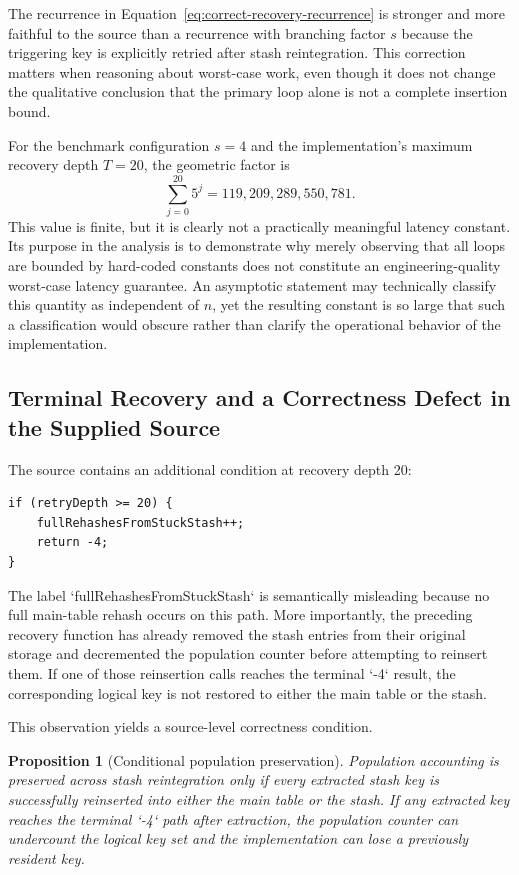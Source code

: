\documentclass[conference]{IEEEtran}
\newtheorem{proposition}{Proposition}
\begin{document}
The recurrence in Equation~\eqref{eq:correct-recovery-recurrence} is stronger and more faithful to the source than a recurrence with branching factor $s$ because the triggering key is explicitly retried after stash reintegration. This correction matters when reasoning about worst-case work, even though it does not change the qualitative conclusion that the primary loop alone is not a complete insertion bound.

For the benchmark configuration $s=4$ and the implementation's maximum recovery depth $T=20$, the geometric factor is
\begin{equation}
    \sum_{j=0}^{20}5^j = 119{,}209{,}289{,}550{,}781.
    \label{eq:recovery-factor-example}
\end{equation}
This value is finite, but it is clearly not a practically meaningful latency constant. Its purpose in the analysis is to demonstrate why merely observing that all loops are bounded by hard-coded constants does not constitute an engineering-quality worst-case latency guarantee. An asymptotic statement may technically classify this quantity as independent of $n$, yet the resulting constant is so large that such a classification would obscure rather than clarify the operational behavior of the implementation.

\subsection{Terminal Recovery and a Correctness Defect in the Supplied Source}

The source contains an additional condition at recovery depth 20:
\begin{lstlisting}[basicstyle=\scriptsize\ttfamily,frame=single]
if (retryDepth >= 20) {
    fullRehashesFromStuckStash++;
    return -4;
}
\end{lstlisting}
The label `fullRehashesFromStuckStash` is semantically misleading because no full main-table rehash occurs on this path. More importantly, the preceding recovery function has already removed the stash entries from their original storage and decremented the population counter before attempting to reinsert them. If one of those reinsertion calls reaches the terminal `-4` result, the corresponding logical key is not restored to either the main table or the stash.

This observation yields a source-level correctness condition.

\begin{proposition}[Conditional population preservation]
Population accounting is preserved across stash reintegration only if every extracted stash key is successfully reinserted into either the main table or the stash. If any extracted key reaches the terminal `-4` path after extraction, the population counter can undercount the logical key set and the implementation can lose a previously resident key.
\end{proposition}
\end{document}
